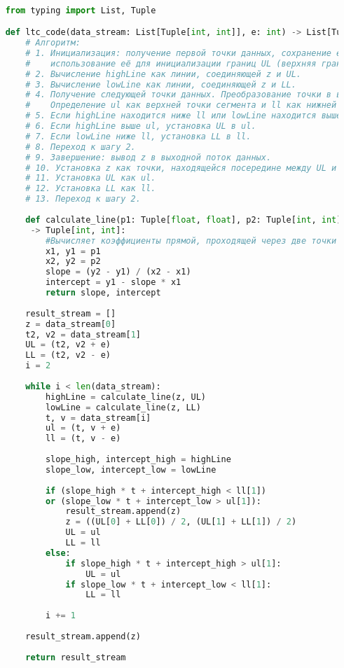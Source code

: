 \begin{lstlisting}[language=python, caption=ltc реализация на языке Python, captionpos=b, frame=single]

    from typing import List, Tuple

    def ltc_code(data_stream: List[Tuple[int, int]], e: int) -> List[Tuple[int, int]]:
        # Алгоритм:
        # 1. Инициализация: получение первой точки данных, сохранение её в z. Получение следующей точки (t2, v2),
        #    использование её для инициализации границ UL (верхняя граница) и LL (нижняя граница).
        # 2. Вычисление highLine как линии, соединяющей z и UL.
        # 3. Вычисление lowLine как линии, соединяющей z и LL.
        # 4. Получение следующей точки данных. Преобразование точки в вертикальный сегмент с использованием погрешности e.
        #    Определение ul как верхней точки сегмента и ll как нижней точки сегмента.
        # 5. Если highLine находится ниже ll или lowLine находится выше ul, переход к шагу 9, иначе продолжение.
        # 6. Если highLine выше ul, установка UL в ul.
        # 7. Если lowLine ниже ll, установка LL в ll.
        # 8. Переход к шагу 2.
        # 9. Завершение: вывод z в выходной поток данных.
        # 10. Установка z как точки, находящейся посередине между UL и LL.
        # 11. Установка UL как ul.
        # 12. Установка LL как ll.
        # 13. Переход к шагу 2.
    
        def calculate_line(p1: Tuple[float, float], p2: Tuple[int, int])
         -> Tuple[int, int]:
            #Вычисляет коэффициенты прямой, проходящей через две точки (p1 и p2)
            x1, y1 = p1
            x2, y2 = p2
            slope = (y2 - y1) / (x2 - x1)
            intercept = y1 - slope * x1
            return slope, intercept
    
        result_stream = []
        z = data_stream[0]
        t2, v2 = data_stream[1]
        UL = (t2, v2 + e)
        LL = (t2, v2 - e)
        i = 2
    
        while i < len(data_stream):
            highLine = calculate_line(z, UL)
            lowLine = calculate_line(z, LL)
            t, v = data_stream[i]
            ul = (t, v + e)
            ll = (t, v - e)
            
            slope_high, intercept_high = highLine
            slope_low, intercept_low = lowLine
            
            if (slope_high * t + intercept_high < ll[1]) 
            or (slope_low * t + intercept_low > ul[1]):
                result_stream.append(z)
                z = ((UL[0] + LL[0]) / 2, (UL[1] + LL[1]) / 2)
                UL = ul
                LL = ll
            else:
                if slope_high * t + intercept_high > ul[1]:
                    UL = ul
                if slope_low * t + intercept_low < ll[1]:
                    LL = ll
    
            i += 1
    
        result_stream.append(z)
        
        return result_stream
\end{lstlisting}


\endinput